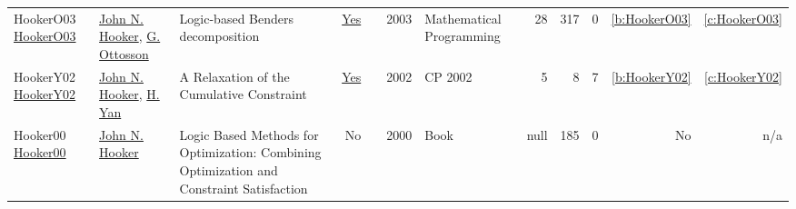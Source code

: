 {\begin{longtable}{>{\raggedright\arraybackslash}p{3cm}>{\raggedright\arraybackslash}p{6cm}>{\raggedright\arraybackslash}p{6.5cm}rrrp{2.5cm}rrrrr}
HookerO03 \href{http://dx.doi.org/10.1007/s10107-003-0375-9}{HookerO03} & \hyperref[auth:a162]{John N. Hooker}, \hyperref[auth:a865]{G. Ottosson} & Logic-based Benders decomposition & \href{works/HookerO03.pdf}{Yes} & \cite{HookerO03} & 2003 & Mathematical Programming & 28 & 317 & 0 & \ref{b:HookerO03} & \ref{c:HookerO03}\\
HookerY02 \href{https://doi.org/10.1007/3-540-46135-3\_46}{HookerY02} & \hyperref[auth:a162]{John N. Hooker}, \hyperref[auth:a294]{H. Yan} & A Relaxation of the Cumulative Constraint & \href{works/HookerY02.pdf}{Yes} & \cite{HookerY02} & 2002 & CP 2002 & 5 & 8 & 7 & \ref{b:HookerY02} & \ref{c:HookerY02}\\
Hooker00 \href{http://dx.doi.org/10.1002/9781118033036}{Hooker00} & \hyperref[auth:a162]{John N. Hooker} & Logic Based Methods for Optimization: Combining Optimization and Constraint Satisfaction & No & \cite{Hooker00} & 2000 & Book & null & 185 & 0 & No & n/a\\
\end{longtable}
}

